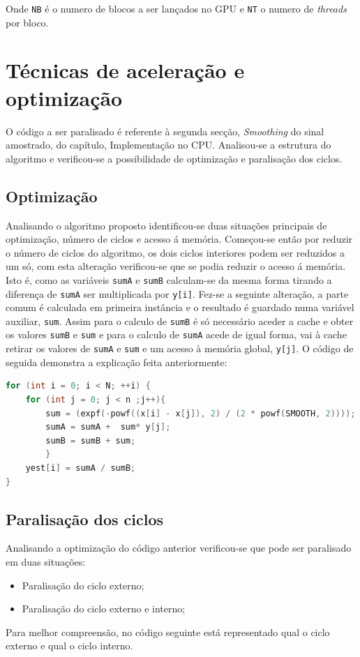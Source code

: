 \documentclass[11pt]{article}
\numberwithin{equation}{section}
\begin{document}
Onde \texttt{NB} é o numero de blocos a ser lançados no GPU e \texttt{NT} o numero de \textit{threads} por bloco.
	
\section{Técnicas de aceleração e optimização}
O código a ser paralisado é referente à segunda secção, \textit{Smoothing}  do sinal amostrado, do capítulo, Implementação no CPU.
Analisou-se a estrutura do algoritmo e verificou-se a possibilidade de optimização e paralisação dos ciclos. 

\subsection{Optimização}
Analisando o algoritmo proposto identificou-se duas situações principais de optimização, número de ciclos e acesso á memória.
Começou-se então por reduzir o número de ciclos do algoritmo, os dois ciclos interiores podem ser reduzidos a um só, com esta alteração verificou-se que se podia reduzir o acesso á memória. Isto é, como as variáveis \texttt{sumA} e \texttt{sumB} calculam-se da mesma forma tirando a diferença de \texttt{sumA}  ser multiplicada por \texttt{y[i]}. Fez-se a seguinte alteração, a parte comum é calculada em primeira instância e o resultado é guardado numa variável auxiliar, \texttt{sum}. Assim para o calculo de \texttt{sumB} é só necessário aceder a cache e obter os valores \texttt{sumB} e \texttt{sum} e para o calculo de \texttt{sumA} acede de igual forma, vai à cache retirar os valores de \texttt{sumA} e \texttt{sum} e um acesso à memória global, \texttt{y[j]}. O código de seguida demonstra a explicação feita anteriormente:
\begin{lstlisting}[language=C]
for (int i = 0; i < N; ++i) {
	for (int j = 0; j < n ;j++){
		sum = (expf(-powf((x[i] - x[j]), 2) / (2 * powf(SMOOTH, 2))));
		sumA = sumA +  sum* y[j];
		sumB = sumB + sum;
		}
	yest[i] = sumA / sumB;
}
\end{lstlisting}

\subsection{Paralisação dos ciclos}
Analisando a optimização do código anterior verificou-se que pode ser paralisado em duas situações:  
\begin{itemize}
	\vspace{-3mm}
	\item Paralisação do ciclo externo;
	\vspace{-1.5mm}
	\item Paralisação do ciclo externo e interno;
\end{itemize}
Para melhor compreensão, no código seguinte está representado qual o ciclo externo e qual o ciclo interno.
\end{document}
